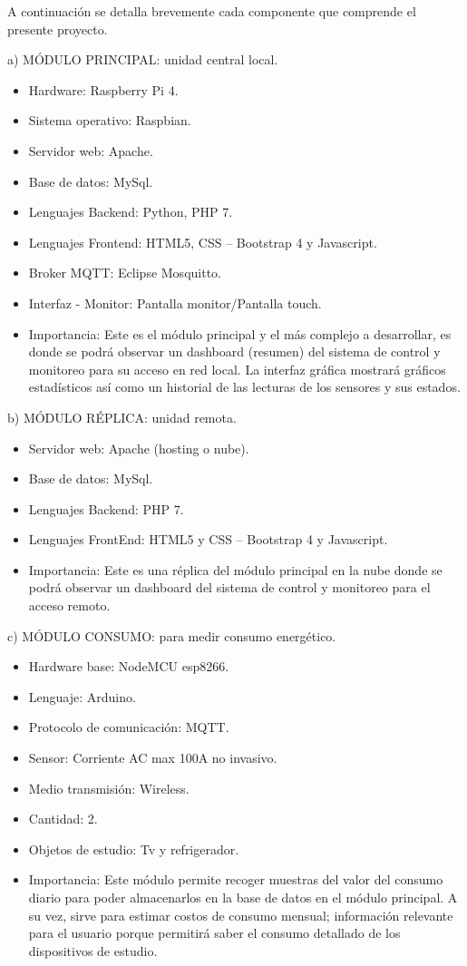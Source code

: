 \documentclass[11pt]{charter}
\begin{document}

A continuación se detalla brevemente cada componente que comprende el presente proyecto.

a) MÓDULO PRINCIPAL: unidad central local.
\begin{itemize}
\item Hardware: Raspberry Pi 4.
\item Sistema operativo: Raspbian.
\item Servidor web: Apache.
\item Base de datos: MySql.
\item Lenguajes Backend: Python, PHP 7.
\item Lenguajes Frontend: HTML5, CSS – Bootstrap 4 y Javascript.
\item Broker MQTT: Eclipse Mosquitto.
\item Interfaz - Monitor: Pantalla monitor/Pantalla touch.
\item Importancia: Este es el módulo principal y el más complejo a desarrollar, es donde se podrá observar un dashboard (resumen) del sistema de control y monitoreo para su acceso en red local. La interfaz gráfica mostrará gráficos estadísticos así como un historial de las lecturas de los sensores y sus estados.
\end{itemize}

b) MÓDULO RÉPLICA: unidad remota.
\begin{itemize}
\item Servidor web: Apache (hosting o nube).
\item Base de datos: MySql.
\item Lenguajes Backend: PHP 7.
\item Lenguajes FrontEnd: HTML5 y CSS – Bootstrap 4 y Javascript.
\item Importancia: Este es una réplica del módulo principal en la nube donde se podrá observar un dashboard del sistema de control y monitoreo para el acceso remoto.
\end{itemize}


c) MÓDULO CONSUMO: para medir consumo energético.
\begin{itemize}
\item Hardware base: NodeMCU esp8266.
\item Lenguaje: Arduino.
\item Protocolo de comunicación: MQTT.
\item Sensor: Corriente AC max 100A no invasivo.
\item Medio transmisión: Wireless.
\item Cantidad: 2.
\item Objetos de estudio: Tv y refrigerador.
\item Importancia: Este módulo permite recoger muestras del valor del consumo diario para poder almacenarlos en la base de datos en el módulo principal. A su vez, sirve para estimar costos de consumo mensual; información relevante para el usuario porque permitirá saber el consumo detallado de los dispositivos de estudio.
\end{itemize}
\end{document}
